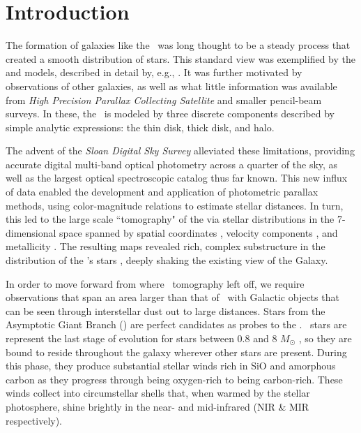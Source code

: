 \section{Introduction}
The formation of galaxies like the \mw\, was long thought to be a steady process that created a smooth distribution of stars. This standard view was exemplified by the \cite{1980ApJS...44...73B} and \cite{1989ARA&A..27..555G} models, described in detail by, e.g., \cite{1993ARA&A..31..575M}. It was further motivated by observations of other galaxies, as well as what little information was available from \emph{High Precision Parallax Collecting Satellite} \citep[\emph{HIPPARCOS}, ][]{1984SSRv...39....1K} and smaller pencil-beam surveys. In these, the \mw\, is modeled by three discrete components described by simple analytic expressions: the thin disk, thick disk, and halo. 

The advent of the \emph{Sloan Digital Sky Survey} \citep[\sdss, ][]{2000AJ....120.1579Y} alleviated these limitations, providing accurate digital multi-band optical photometry across a quarter of the sky, as well as the largest optical spectroscopic catalog thus far known. This new influx of data enabled the development and application of photometric parallax methods, using color-magnitude relations to estimate stellar distances. In turn, this led to the large scale ``tomography" of the \mw\; via stellar distributions in the 7-dimensional space spanned by spatial coordinates \citep{2008ApJ...673..864J}, velocity components \citep{2010ApJ...716....1B}, and metallicity \citep{2008ApJ...684..287I}. The resulting maps revealed rich, complex substructure in the distribution of the \mw's stars \citep[e.g.][]{2000AJ....120..963I,2000ApJ...540..825Y,2001ApJ...554L..33V,2002ApJ...569..245N,2003ApJ...599.1082M,2006ApJ...642L.137B,2006ApJ...651L..29G,2006AJ....132..714V}, deeply shaking the existing view of the Galaxy. 

In order to move forward from where \sdss\, tomography left off, we require observations that span an area larger than that of \sdss\, with Galactic objects that can be seen through interstellar dust out to large distances. Stars from the Asymptotic Giant Branch (\agb) are perfect candidates as probes to the \mw. \agb\, stars are represent the last stage of evolution for stars between 0.8 and 8 $M_\odot$ \citep{1983ARA&A..21..271I, 2005ARA&A..43..435H}, so they are bound to reside throughout the galaxy wherever other stars are present. During this phase, they produce substantial stellar winds \citep[$10^{-7} < \dot{M} < 10^{-4} M_\odot$ yr$^{-1}$,][]{2002A&A...391.1053O} rich in SiO and amorphous carbon as they progress through being oxygen-rich to being carbon-rich. These winds collect into circumstellar shells that, when warmed by the stellar photosphere, shine brightly in the near- and mid-infrared (NIR \& MIR respectively). 

